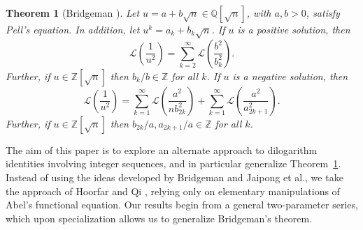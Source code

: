 \documentclass[10pt]{article}
\newtheorem{theorem}{Theorem}
\theoremstyle{definition}
\begin{document}
\begin{theorem}[Bridgeman \cite{bridgeman2021dilogarithm}]\label{thm:bridgeman}
    Let $u = a+b\sqrt{n} \in \mathbb{Q}[\sqrt{n}]$, with $a,b > 0$, satisfy Pell's equation. In addition, let $u^k = a_k + b_k \sqrt{n}$.  If $u$ is a positive solution, then
    \begin{equation}
        \mathcal{L}\left(\frac{1}{u^2}\right) = \sum_{k=2}^{\infty}\mathcal{L}\left(\frac{b^2}{b^2_k}\right). \label{eq:bridgeman_pos}
    \end{equation}
    Further, if $u \in \mathbb{Z}[\sqrt{n}]$ then $b_k/b \in \mathbb{Z}$ for all $k$.  If $u$ is a negative solution, then
    \begin{equation}
        \mathcal{L}\left(\frac{1}{u^2}\right) = \sum_{k=1}^{\infty}\mathcal{L}\left(\frac{a^2}{n b^2_{2k}}\right) + \sum_{k=1}^{\infty}\mathcal{L}\left(\frac{a^2}{a^2_{2k+1}}\right). \label{eq:bridgeman_neg}
    \end{equation}
    Further, if $u \in \mathbb{Z}[\sqrt{n}]$ then $b_{2k}/a, a_{2k+1}/a \in \mathbb{Z}$ for all $k$.
\end{theorem}
The aim of this paper is to explore an alternate approach to dilogarithm identities involving integer sequences, and in particular generalize Theorem~\ref{thm:bridgeman}.  Instead of using the ideas developed by Bridgeman and Jaipong et al., we take the approach of Hoorfar and Qi \cite{hoorfar2009sums}, relying only on elementary manipulations of Abel's functional equation.  Our results begin from a general two-parameter series, which upon specialization allows us to generalize Bridgeman's theorem.  
\end{document}
